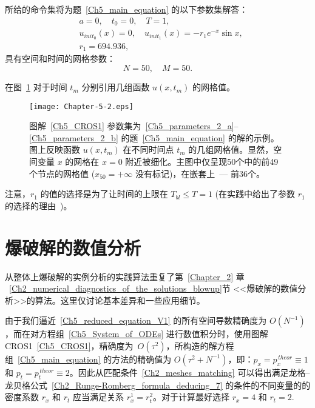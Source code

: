 \documentclass[twoside]{book}
\begin{document}
\begin{CJK*}{GBK}{song}
所给的命令集将为题~\eqref{Ch5_main_equation} 的以下参数集解答：
\begin{equation}
    \label{Ch5_parameters_2_a}
    \begin{aligned}
        &a = 0, \quad t_0 = 0, \quad T = 1, \\
        &u_{init_0}(x) = 0, \quad u_{init_1}(x) = -r_1 e^{-x}\sin x, \\
        &r_1 = 694.936,
    \end{aligned}
\end{equation}
具有空间和时间的网格参数：
\begin{equation}
    \label{Ch5_parameters_2_b}
    N = 50, \quad M = 50.
\end{equation}


在图~\ref{Fig_5_2} 对于时间 $t_m$ 分别引用几组函数 $u(x,t_m)$ 的网格值。
\begin{figure}[t!]
    \centering
    \texttt{[image: Chapter-5-2.eps]}\\
    \caption{图解~\eqref{Ch5_CROS1} 参数集为~\eqref{Ch5_parameters_2_a}--\eqref{Ch5_parameters_2_b} 的题~\eqref{Ch5_main_equation} 的解的示例。图上反映函数 $u(x,t_m)$ 在不同时间点 $t_m$ 的几组网格值。显然，空间变量 $x$ 的网格在 $x = 0$ 附近被细化。主图中仅呈现50个中的前49个节点的网格值 ($x_{50} = +\infty$ 没有标记)，在嵌套上~--- 前36个。}
    \label{Fig_5_2}
\end{figure}

注意，$r_1$ 的值的选择是为了让时间的上限在 $T_{bl} \leqslant T = 1$ (在实践中给出了参数 $r_1$ 的选择的理由~\cite{Lukyanenko_2})。


\section{爆破解的数值分析}


从整体上爆破解的实例分析的实践算法重复了第~\ref{Chapter_2} 章 ~\ref{Ch2_numerical_diagnostics_of_the_solutions_blowup}节 <<爆破解的数值分析>>的算法。这里仅讨论基本差异和一些应用细节。

由于我们逼近~\eqref{Ch5_reduced_equation_V1} 的所有空间导数精确度为 $O(N^{-1})$，而在对方程组~\eqref{Ch5_System_of_ODEs} 进行数值积分时，使用图解 CROS1~\eqref{Ch5_CROS1}，精确度为~$O(\tau^2)$，所构造的解方程组~\eqref{Ch5_main_equation} 的方法的精确值为 $O(\tau^2 + N^{-1})$，即：$p_x = p_x^{\, theor} \equiv 1$ 和 $p_t = p_t^{\, theor} \equiv 2$。因此从匹配条件~\eqref{Ch2_meshes_matching} 可以得出满足龙格--龙贝格公式~\eqref{Ch2_Runge-Romberg_formula_deducing_7} 的条件的不同变量的的密度系数 $r_x$ 和 $r_t$ 应当满足关系 $r_x^1 = r_t^2$。对于计算最好选择 $r_x = 4$ 和 $r_t = 2$.


\end{CJK*}
\end{document}
